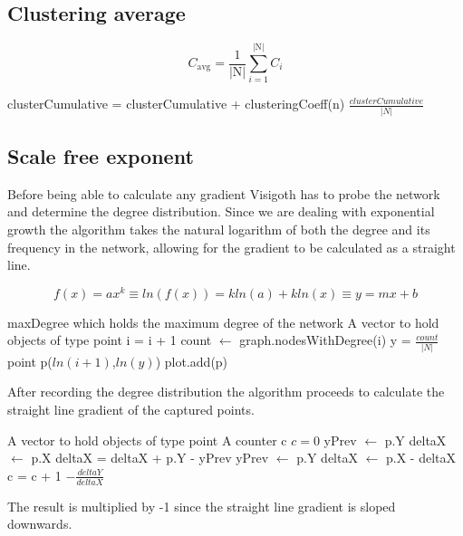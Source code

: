 \documentclass[a4paper,11pt,titlepage]{article}
\begin{document}
\subsection{Clustering average}
\[ C_\mathrm{avg} =
   \frac{1}{\mathrm{|N|}}\sum_{i=1}^{\mathrm{|N|}} C_i
\]

\begin{algorithmic}
    \STATE clusterCumulative = clusterCumulative + clusteringCoeff(n)
  \ENDFOR
  \RETURN $\frac{clusterCumulative}{|N|}$
\end{algorithmic}


\subsection{Scale free exponent}
Before being able to calculate any gradient Visigoth has to probe the network
and determine the degree distribution. Since we are dealing with exponential
growth the algorithm takes the natural logarithm of both the degree and its
frequency in the network, allowing for the gradient to be calculated as a
straight line.

\[ f(x) = ax^k \equiv ln(f(x)) = kln(a) + kln(x) \equiv y = mx + b \]

\begin{algorithmic}
  \REQUIRE maxDegree which holds the maximum degree of the network
  \REQUIRE A vector to hold objects of type point
    \STATE i = i + 1
    \STATE count $\gets$ graph.nodesWithDegree(i)
    \STATE y = $\frac{count}{|N|}$
      \STATE  point p($ln(i+1)$,$ln(y)$)
      \STATE plot.add(p)
    \ENDIF
  \ENDFOR
\end{algorithmic}

After recording the degree distribution the algorithm proceeds to
calculate the straight line gradient of the captured points.

\begin{algorithmic}
  \REQUIRE A vector to hold objects of type point
  \REQUIRE A counter c
  \STATE $c = 0$
      \STATE yPrev $\gets$ p.Y
      \STATE deltaX $\gets$ p.X
    \ELSE
      \STATE deltaX = deltaX + p.Y - yPrev
      \STATE yPrev $\gets$ p.Y
      \STATE deltaX $\gets$ p.X - deltaX
    \ENDIF
      \STATE c = c + 1
  \ENDFOR
  \RETURN $- \frac{deltaY}{deltaX}$
\end{algorithmic}

The result is multiplied by -1 since the straight line
gradient is sloped downwards.
\end{document}
